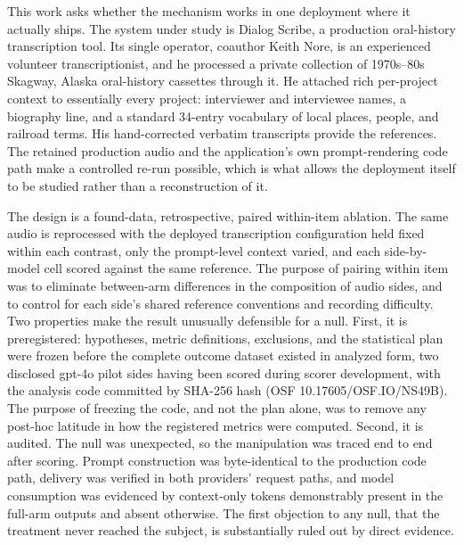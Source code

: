 \documentclass[11pt]{article}
\begin{document}
This work asks whether the mechanism works in one deployment where it actually ships. The system under study is Dialog Scribe, a production oral-history transcription tool. Its single operator, coauthor Keith Nore, is an experienced volunteer transcriptionist, and he processed a private collection of 1970s--80s Skagway, Alaska oral-history cassettes through it. He attached rich per-project context to essentially every project: interviewer and interviewee names, a biography line, and a standard 34-entry vocabulary of local places, people, and railroad terms. His hand-corrected verbatim transcripts provide the references. The retained production audio and the application's own prompt-rendering code path make a controlled re-run possible, which is what allows the deployment itself to be studied rather than a reconstruction of it.

The design is a found-data, retrospective, paired within-item ablation. The same audio is reprocessed with the deployed transcription configuration held fixed within each contrast, only the prompt-level context varied, and each side-by-model cell scored against the same reference. The purpose of pairing within item was to eliminate between-arm differences in the composition of audio sides, and to control for each side's shared reference conventions and recording difficulty. Two properties make the result unusually defensible for a null. First, it is preregistered: hypotheses, metric definitions, exclusions, and the statistical plan were frozen before the complete outcome dataset existed in analyzed form, two disclosed gpt-4o pilot sides having been scored during scorer development, with the analysis code committed by SHA-256 hash (OSF 10.17605/OSF.IO/NS49B). The purpose of freezing the code, and not the plan alone, was to remove any post-hoc latitude in how the registered metrics were computed. Second, it is audited. The null was unexpected, so the manipulation was traced end to end after scoring. Prompt construction was byte-identical to the production code path, delivery was verified in both providers' request paths, and model consumption was evidenced by context-only tokens demonstrably present in the full-arm outputs and absent otherwise. The first objection to any null, that the treatment never reached the subject, is substantially ruled out by direct evidence.
\end{document}
